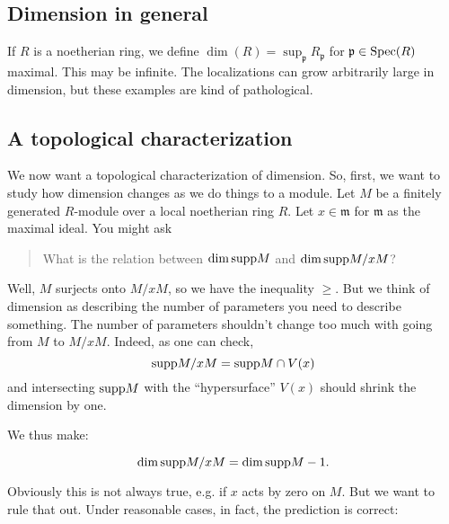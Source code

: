 \subsection{Dimension in general}
\begin{definition} 
If $R$ is a noetherian ring, we define $\dim (R) = \sup_{\mathfrak{p}}
R_{\mathfrak{p}}$ for $\mathfrak{p} \in \mathrm{Spec}(R)$ maximal. This may be infinite. The
localizations can grow arbitrarily large in dimension, but these examples are
kind of pathological.
\end{definition} 

\subsection{A topological characterization} We now want a topological
characterization of dimension. So, first, we want to study how dimension
changes as we do things to a module. Let $M$ be a finitely generated $R$-module over a local
noetherian ring $R$. Let $x \in \mathfrak{m}$ for $\mathfrak{m}$ as the maximal
ideal.
You might ask
\begin{quote}
What is the relation between $\dim \mathrm{supp} M$ and $\dim \mathrm{supp} M/xM$?
\end{quote}
Well, $M$ surjects onto $M/xM$, so we have the inequality $\geq$. But we think
of dimension as describing the number of parameters you need to describe
something. The number of parameters shouldn't change too much with going from
$M$ to $M/xM$. Indeed, as one can check,
\[ \mathrm{supp} M/xM = \mathrm{supp} M \cap V(x)  \]
and intersecting $\mathrm{supp} M$ with the ``hypersurface'' $V(x)$ should shrink the
dimension by one. 


We thus make:
\begin{prediction}
\[ \dim \mathrm{supp} M/xM = \dim \mathrm{supp} M - 1.  \]
\end{prediction}
Obviously this is not always true, e.g. if $x$ acts by zero on $M$. But we want
to rule that out. 
Under reasonable cases, in fact, the prediction is correct:

